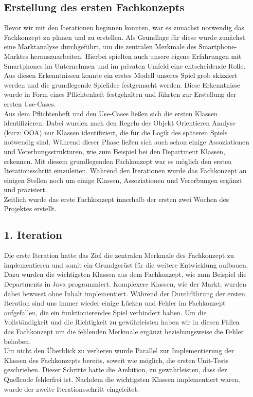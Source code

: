 \subsection{Erstellung des ersten Fachkonzepts}
Bevor wir mit den Iterationen beginnen konnten, war es zunächst notwendig das Fachkonzept zu planen und zu erstellen. Als Grundlage für diese wurde zunächst eine Marktanalyse durchgeführt, um die zentralen Merkmale des Smartphone-Marktes herauszuarbeiten. Hierbei spielten auch unsere eigene Erfahrungen mit Smartphones im Unternehmen und im privaten Umfeld eine entscheidende Rolle. Aus diesen Erkenntnissen konnte ein erstes Modell unseres Spiel grob skizziert werden und die grundlegende Spielidee festgemacht werden. Diese Erkenntnisse wurde in Form eines Pflichtenheft festgehalten und führten zur Erstellung der ersten Use-Cases. \\
Aus dem Pflichtenheft und den Use-Cases ließen sich die ersten Klassen identifizieren. Dabei wurden nach den Regeln der Objekt Orientieren Analyse (kurz: OOA) nur Klassen identifiziert, die für die Logik des späteren Spiels notwendig sind. Während dieser Phase ließen sich auch schon einige Assoziationen und Vererbungsstrukturen, wie zum Beispiel bei den Department Klassen, erkennen. Mit diesem grundlegenden Fachkonzept war es möglich den ersten Iterationsschritt einzuleiten. Während den Iterationen wurde das Fachkonzept an einigen Stellen noch um einige Klassen, Assoziationen und Vererbungen ergänzt und präzisiert.\\
Zeitlich wurde das erste Fachkonzept innerhalb der ersten zwei Wochen des Projektes erstellt.


\subsection{1. Iteration}
Die erste Iteration hatte das Ziel die zentralen Merkmale des Fachkonzept zu implementieren und somit ein Grundgerüst für die weitere Entwicklung aufbauen. Dazu wurden die wichtigsten Klassen aus dem Fachkonzept, wie zum Beispiel die Departments in Java programmiert. Komplexere Klassen, wie der Markt, wurden dabei bewusst ohne Inhalt implementiert. Während der Durchführung der ersten Iteration sind uns immer wieder einige Lücken und Fehler im Fachkonzept aufgefallen, die ein funktionierendes Spiel verhindert haben. Um die Vollständigkeit und die Richtigkeit zu gewährleisten haben wir in diesen Fällen das Fachkonzept um die fehlenden Merkmale ergänzt beziehungsweise die Fehler behoben. \\
Um nicht den Überblick zu verlieren wurde Parallel zur Implementierung der Klassen des Fachkonzepts bereits, soweit wie möglich, die ersten Unit-Tests geschrieben. Dieser Schritte hatte die Ambition, zu gewährleisten, dass der Quellcode fehlerfrei ist. Nachdem die wichtigsten Klassen implementiert waren, wurde der zweite Iterationsschritt eingeleitet.

